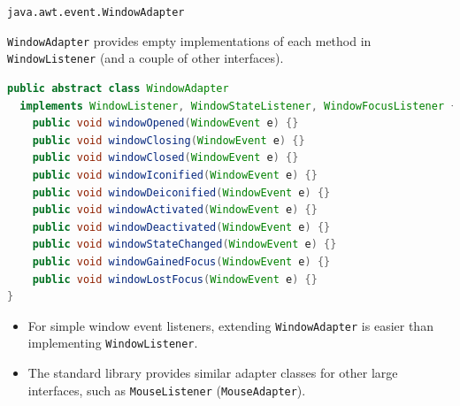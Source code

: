 \documentclass{beamer}
\begin{document}
\begin{frame}[fragile]{{\tt java.awt.event.WindowAdapter}}


{\tt WindowAdapter} provides empty implementations of each method in {\tt WindowListener} (and a couple of other interfaces).
\begin{lstlisting}[language=Java]
public abstract class WindowAdapter
  implements WindowListener, WindowStateListener, WindowFocusListener {
    public void windowOpened(WindowEvent e) {}
    public void windowClosing(WindowEvent e) {}
    public void windowClosed(WindowEvent e) {}
    public void windowIconified(WindowEvent e) {}
    public void windowDeiconified(WindowEvent e) {}
    public void windowActivated(WindowEvent e) {}
    public void windowDeactivated(WindowEvent e) {}
    public void windowStateChanged(WindowEvent e) {}
    public void windowGainedFocus(WindowEvent e) {}
    public void windowLostFocus(WindowEvent e) {}
}
\end{lstlisting}
\vspace{-.1in}
\begin{itemize}
\item For simple window event listeners, extending {\tt WindowAdapter} is easier than implementing {\tt WindowListener}.
\item The standard library provides similar adapter classes for other large interfaces, such as {\tt MouseListener} ({\tt MouseAdapter}).
\end{itemize}


\end{frame}
\end{document}
